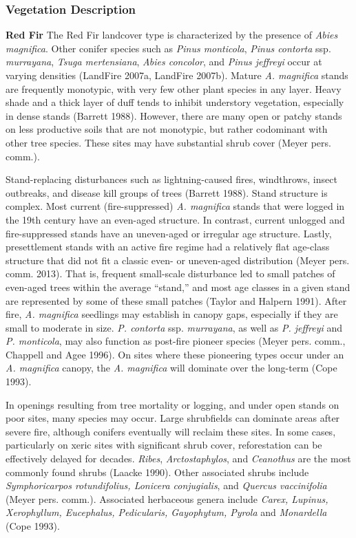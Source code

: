 \subsubsection{Vegetation Description}
\textbf{Red Fir} The Red Fir landcover type is characterized by the presence of \emph{Abies magnifica}. Other conifer species such as \emph{Pinus monticola}, \emph{Pinus contorta} ssp. \emph{murrayana}, \emph{Tsuga mertensiana}, \emph{Abies concolor}, and \emph{Pinus jeffreyi} occur at varying densities (LandFire 2007a, LandFire 2007b). Mature \emph{A. magnifica} stands are frequently monotypic, with very few other plant species in any layer. Heavy shade and a thick layer of duff tends to inhibit understory vegetation, especially in dense stands (Barrett 1988). However, there are many open or patchy stands on less productive soils that are not monotypic, but rather codominant with other tree species. These sites may have substantial shrub cover (Meyer pers. comm.).

Stand-replacing disturbances such as lightning-caused fires, windthrows, insect outbreaks, and disease kill groups of trees (Barrett 1988). Stand structure is complex. Most current (fire-suppressed) \emph{A. magnifica} stands that were logged in the 19th century have an even-aged structure. In contrast, current unlogged and fire-suppressed stands have an uneven-aged or irregular age structure. Lastly, presettlement stands with an active fire regime had a relatively flat age-class structure that did not fit a classic even- or uneven-aged distribution (Meyer pers. comm. 2013). That is, frequent small-scale disturbance led to small patches of even-aged trees within the average ``stand,'' and most age classes in a given stand are represented by some of these small patches (Taylor and Halpern 1991). After fire, \emph{A. magnifica} seedlings may establish in canopy gaps, especially if they are small to moderate in size. \emph{P. contorta} ssp. \emph{murrayana}, as well as \emph{P. jeffreyi} and \emph{P. monticola}, may also function as post-fire pioneer species (Meyer pers. comm., Chappell and Agee 1996). On sites where these pioneering types occur under an \emph{A. magnifica} canopy, the \emph{A. magnifica} will dominate over the long-term (Cope 1993).

In openings resulting from tree mortality or logging, and under open stands on poor sites, many species may occur. Large shrubfields can dominate areas after severe fire, although conifers eventually will reclaim these sites. In some cases, particularly on xeric sites with significant shrub cover, reforestation can be effectively delayed for decades. \emph{Ribes}, \emph{Arctostaphylos}, and \emph{Ceanothus} are the most commonly found shrubs (Laacke 1990). Other associated shrubs include \emph{Symphoricarpos rotundifolius, Lonicera conjugialis}, and \emph{Quercus vaccinifolia} (Meyer pers. comm.). Associated herbaceous genera include \emph{Carex, Lupinus, Xerophyllum, Eucephalus, Pedicularis, Gayophytum, Pyrola} and \emph{Monardella} (Cope 1993).



